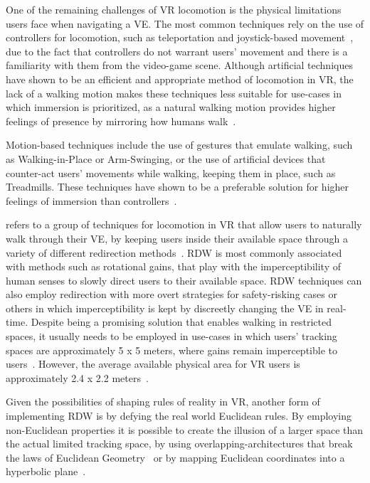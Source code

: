 One of the remaining challenges of \gls{VR} locomotion is the physical limitations users face when navigating a \gls{VE}.
The most common techniques rely on the use of controllers for locomotion, such as teleportation and joystick-based movement~\cite{Coomer2018}, 
due to the fact that controllers do not warrant users' movement and there is a familiarity with them from the video-game scene.
Although artificial techniques have shown to be an efficient and appropriate method of locomotion in \gls{VR}, the lack of a 
walking motion makes these techniques less suitable for use-cases in which immersion is prioritized, as a natural walking motion 
provides higher feelings of presence by mirroring how humans walk~\cite{Nilsson2018}.

Motion-based techniques 
include the use of gestures that emulate walking, such as Walking-in-Place or Arm-Swinging, or the use of artificial 
devices that counter-act users' movements while walking, keeping them in place, such as Treadmills. These techniques have 
shown to be a preferable solution for higher feelings of immersion than controllers~\cite{Nilsson2018}.

 refers to a group of techniques for locomotion in \gls{VR} that allow users to naturally walk through their \gls{VE}, by keeping  
users inside their available space through a variety of different redirection methods~\cite{8255772}. \gls{RDW} is most commonly associated with methods such as 
rotational gains, that play with the imperceptibility of human senses to slowly direct users to their available space.
\gls{RDW} techniques can also employ redirection with more overt strategies for 
safety-risking cases or others in which imperceptibility is kept by discreetly changing the \gls{VE} in real-time. 
Despite being a promising solution that enables walking in restricted spaces, 
it usually needs to be employed in use-cases in which users' tracking spaces are approximately 5 x 5 meters, 
where gains remain imperceptible to users~\cite{Razzaque2001, Steinicke2010}. However, the average available physical area for 
\gls{VR} users is approximately 2.4 x 2.2 meters~\cite{Azmandian2015, Liu2018b}. 

Given the possibilities of shaping rules of reality in \gls{VR}, another form of implementing \gls{RDW} is by defying the real world Euclidean rules.
By employing non-Euclidean properties it is possible to create the illusion of a larger space than the actual limited tracking space, by using overlapping-architectures
that break the laws of Euclidean Geometry~\cite{Suma2012,Vasylevska2017} or by mapping Euclidean coordinates into a hyperbolic plane~\cite{Pisani2019, Rebelo2022}. 

